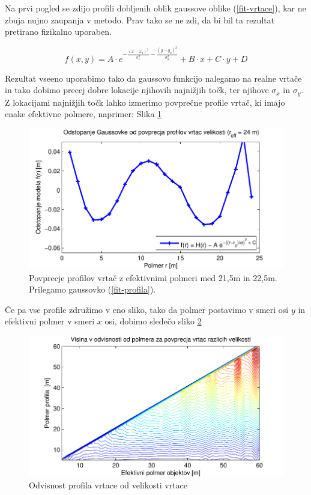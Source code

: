 \documentclass[a4paper, oneside, 12pt]{book}
\begin{document}
Na prvi pogled se zdijo profili dobljenih oblik gaussove oblike (\ref{fit-vrtace}), kar ne zbuja nujno zaupanja v metodo. Prav tako se ne zdi, da bi bil ta rezultat pretirano fizikalno uporaben.

\begin{equation}
  f(x,y) = A \cdot e^{-\frac{(x-x_0)^2}{\sigma_x^2}-\frac{(y-y_0)^2}{\sigma_y^2}} + B \cdot x + C \cdot y + D  
  \label{fit-vrtace}
\end{equation}

Rezultat vseeno uporabimo tako da gaussovo funkcijo nalegamo na realne vrtače in tako dobimo precej dobre lokacije njihovih najnižjih točk, ter njihove $\sigma_x$ in $\sigma_y$. Z lokacijami najnižjih točk lahko izmerimo povprečne profile vrtač, ki imajo enake efektivne polmere, naprimer: Slika \ref{fig:menisija-profil-21-fit}

\begin{figure}[H]
  \centering
  \includegraphics{slike/menisija-profil-21-fit}
  \caption{Povprecje profilov vrtač z efektivnimi polmeri med 21,5m in 22,5m. Prilegamo gaussovko (\ref{fit-profila}).}
  \label{fig:menisija-profil-21-fit}
\end{figure}

Če pa vse profile združimo v eno sliko, tako da polmer postavimo v smeri osi $y$ in efektivni polmer v smeri $x$ osi, dobimo sledečo sliko \ref{fig:menisija-profil-profilov}

\begin{figure}[H]
  \centering
  \includegraphics{slike/menisija-profil-profilov}
  \caption{Odvisnost profila vrtace od velikosti vrtace}
  \label{fig:menisija-profil-profilov}
\end{figure}
\end{document}
